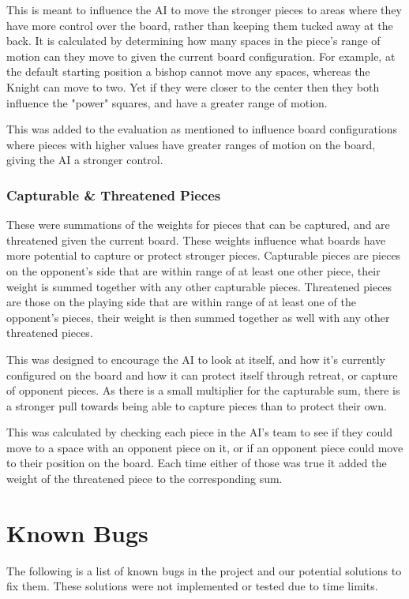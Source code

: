 \documentclass[conference]{IEEEtran}
\begin{document}
This is meant to influence the AI to move the stronger pieces to areas where they have more control over the board, rather than keeping them tucked away at the back. It is calculated by determining how many spaces in the piece's range of motion can they move to given the current board configuration. For example, at the default starting position a bishop cannot move any spaces, whereas the Knight can move to two. Yet if they were closer to the center then they both influence the "power" squares, and have a greater range of motion. 

This was added to the evaluation as mentioned to influence board configurations where pieces with higher values have greater ranges of motion on the board, giving the AI a stronger control. 

\subsubsection{Capturable \& Threatened Pieces}
These were summations of the weights for pieces that can be captured, and are threatened given the current board. These weights influence what boards have more potential to capture or protect stronger pieces. Capturable pieces are pieces on the opponent's side that are within range of at least one other piece, their weight is summed together with any other capturable pieces. Threatened pieces are those on the playing side that are within range of at least one of the opponent's pieces, their weight is then summed together as well with any other threatened pieces. 

This was designed to encourage the AI to look at itself, and how it's currently configured on the board and how it can protect itself through retreat, or capture of opponent pieces. As there is a small multiplier for the capturable sum, there is a stronger pull towards being able to capture pieces than to protect their own. 

This was calculated by checking each piece in the AI's team to see if they could move to a space with an opponent piece on it, or if an opponent piece could move to their position on the board. Each time either of those was true it added the weight of the threatened piece to the corresponding sum. 


\section{Known Bugs}
The following is a list of known bugs in the project and our potential solutions to fix them. These solutions were not implemented or tested due to time limits. 
\end{document}
